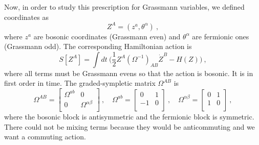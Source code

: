     Now, in order to study this prescription for Grassmann variables, we defined coordinates as
    \begin{equation*}
        Z^A = (z^a, \theta^\alpha) ~,
    \end{equation*}
    where $z^a$ are bosonic coordinates (Grassmann even) and  $\theta^\alpha$ are fermionic ones (Grassmann odd). The corresponding Hamiltonian action is 
    \begin{equation*}
        S[Z^A] = \int dt ~ \Big (\frac{1}{2} Z^A (\Omega^{-1})_{AB} \dot Z^B - H(Z) \Big) ~,
    \end{equation*}
    where all terms must be Grassmann evens so that the action is bosonic. It is in first order in time. The graded-sympletic matrix $\Omega^{AB}$ is 
    \begin{equation*}
        \Omega^{AB} = \begin{bmatrix}
            \Omega^{ab} & 0 \\ 0 & \Omega^{\alpha\beta} \\
        \end{bmatrix} ~, \quad \Omega^{ab} = \begin{bmatrix}
            0 & 1  \\ -1 & 0 \\
        \end{bmatrix} ~, \quad \Omega^{\alpha\beta} = \begin{bmatrix}
            0 & 1  \\ 1 & 0 \\
        \end{bmatrix} ~,
    \end{equation*}
    where the bosonic block is antisymmetric and the fermionic block is symmetric. There could not be mixing terms because they would be anticommuting and we want a commuting action.
